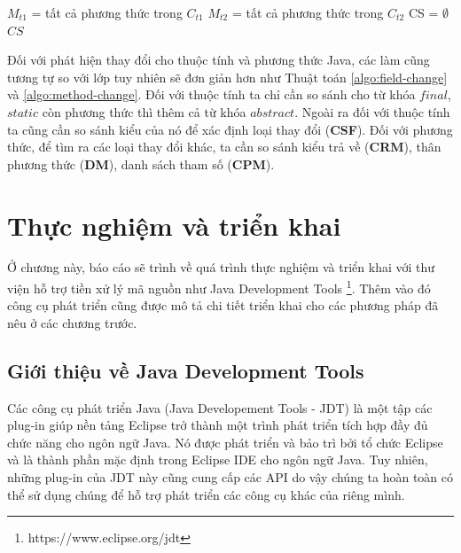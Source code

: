 \documentclass[12pt]{report}
\newenvironment{thuattoan}[1][h]
  {\renewcommand{\algorithmcfname}{Thuật toán}
   \begin{algorithm}[#1]
  }{\end{algorithm}}
\begin{document}
\begin{thuattoan}
	\label{algo:method-change}
	\caption{$MethodChange(C_{t1}, C_{t2})$}
	
	$M_{t1}$ = tất cả phương thức trong $C_{t1}$\;
	$M_{t2}$ = tất cả phương thức trong $C_{t2}$\;
	CS = $\emptyset$\;
	\Return $CS$\;
\end{thuattoan}

Đối với phát hiện thay đổi cho thuộc tính và phương thức Java, các làm cũng tương tự so với lớp tuy nhiên sẽ đơn giản hơn như Thuật toán \ref{algo:field-change} và \ref{algo:method-change}. Đối với thuộc tính ta chỉ cần so sánh cho từ khóa $final$, $static$ còn phương thức thì thêm cả từ khóa $abstract$. Ngoài ra đối với thuộc tính ta cũng cần so sánh kiểu của nó để xác định loại thay đổi (\textbf{CSF}). Đối với phương thức, để tìm ra các loại thay đổi khác, ta cần so sánh kiểu trả về (\textbf{CRM}), thân phương thức (\textbf{DM}), danh sách tham số (\textbf{CPM}).

\chapter{Thực nghiệm và triển khai}
Ở chương này, báo cáo sẽ trình về quá trình thực nghiệm và triển khai với thư viện hỗ trợ tiền xử lý mã nguồn như Java Development Tools \footnote{https://www.eclipse.org/jdt}. Thêm vào đó công cụ phát triển cũng được mô tả chi tiết triển khai cho các phương pháp đã nêu ở các chương trước.

\section{Giới thiệu về Java Development Tools}
Các công cụ phát triển Java (Java Developement Tools - JDT) là một tập các plug-in giúp nền tảng Eclipse trở thành một trình phát triển tích hợp đầy đủ chức năng cho ngôn ngữ Java. Nó được phát triển và bảo trì bởi tổ chức Eclipse và là thành phần mặc định trong Eclipse IDE cho ngôn ngữ Java. Tuy nhiên, những plug-in của JDT này cũng cung cấp các API do vậy chúng ta hoàn toàn có thể sử dụng chúng để hỗ trợ phát triển các công cụ khác của riêng mình.
\end{document}
